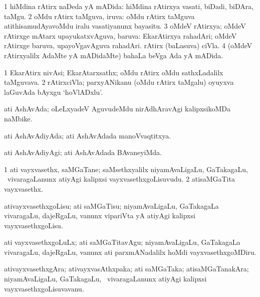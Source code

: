 \bentry
{}
\gl{\gu}
\bmng
\bnum
\num{1} hiMdina rAtirx naDeda yA mADida:  hiMdina rAtirxya vasati, biDadi, biDAra, taMgu. 
\num{2} oMdu rAtirx taMguva, iruva:  oMdu rAtirx taMguva atithisamudAyavoMdu iralu vasatiyanunx bayasitu. 
\num{3} oMdeV rAtirxya; oMdeV rAtirxge mAtarx upayukatxvAguva, baruva:  EkarAtirxya rahadAri; oMdeV rAtirxge baruva, upayoVgavAguva rahadAri.  rAtirx (baLasuva) ciVla. 
\num{4} (oMdeV rAtirxyalilx AdaMte yA mADidaMte) bahaLa beVga Ada yA mADida. 
\enum
\emng
\eentry


\bentry
{}
\gl{\nA}
\bmng
\bnum
\num{1} EkarAtirx nivAsi; EkarAtarxsathx; oMdu rAtirx oMdu sathxLadalilx taMguvava. 
\num{2} rAtirxciVla; parxyANikanu (oMdu rAtirx taMgalu) oyuyxva laGuvAda bAyxgu `hoVlADxlu'. 
\enum
\emng
\eentry


\bentry
{}
\gl{\nA}
\bmng
ati AshAvAda; oLeLxyadeV AguvudeMdu nirAdhAravAgi kalipxsikoMDa naMbike. 
\emng
\eentry


\bentry
{}
\gl{\gu}
\bmng
ati AshAvAdiyAda; ati AshAvAdada manoVvaqtitxya. 
\emng
\eentry


\bentry
{}
\gl{\kirxvi}
\bmng
ati AshAvAdiyAgi; ati AshAvAdada BAvaneyiMda. 
\emng
\eentry


\bentry
{}
\gl{\nA}
\bmng
\bnum
\num{1} ati vayxvasethx, saMGaTane; saMsethxyalilx niyamAvaLigaLu, GaTakagaLu, \mo\ vivaragaLanunx atiyAgi kalipxsi vayxvasethxgoLisuvudu. 
\num{2} atisaMGaTita vayxvasethx. 
\enum
\emng
\eentry


\bentry
{}
\gl{\sakirx}
\bmng
ativayxvasethxgoLisu; ati saMGaTisu; niyamAvaLigaLu, GaTakagaLa vivaragaLu, dajeRgaLu, \mo vanunx vipariVta yA atiyAgi kalipxsi vayxvasethxgoLisu. 
\emng

\noindent
\gl{\akirx}
\bmng
ati vayxvasethxgoLuLx; ati saMGaTitavAgu; niyamAvaLigaLu, GaTakagaLa vivaragaLu, dajeRgaLu, \mo vanunx ati parxmANadalilx hoMdi vayxvasethxgoMDiru. 
\emng
\eentry

\bentry
{}
\gl{\nA}
\bmng
ativayxvasethxgAra; ativayxvasAthxpaka; ati saMGaTaka; atisaMGaTanakAra; niyamAvaLigaLu, GaTakagaLu, \mo\ vivaragaLanunx atiyAgi kalipxsi vayxvasethxgoLisuvavanu. 
\emng
\eentry


